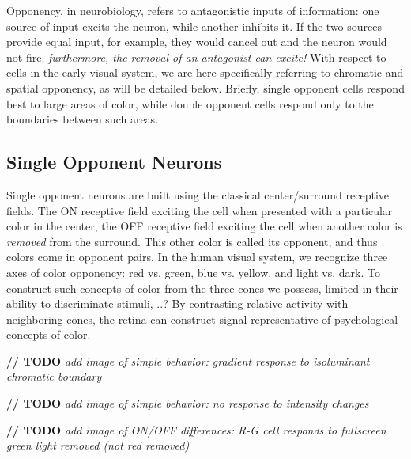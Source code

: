 \documentclass[journal,onecolumn]{IEEEtran}
\begin{document}
Opponency, in neurobiology, refers to antagonistic inputs of information: one source of input excits the neuron, while another inhibits it. If the two sources provide equal input, for example, they would cancel out and the neuron would not fire. 
\textit{furthermore, the removal of an antagonist can excite!}
With respect to cells in the early visual system, we are here specifically referring to chromatic and spatial opponency, as will be detailed below. Briefly, single opponent cells respond best to large areas of color, while double opponent cells respond only to the boundaries between such areas.


\subsection*{Single Opponent Neurons}

Single opponent neurons are built using the classical center/surround receptive fields. The ON receptive field exciting the cell when presented with a particular color in the center, the OFF receptive field exciting the cell when another color is \textit{removed} from the surround. This other color is called its opponent, and thus colors come in opponent pairs. In the human visual system, we recognize three axes of color opponency: red vs. green, blue vs. yellow, and light vs. dark. To construct such concepts of color from the three cones we possess, limited in their ability to discriminate stimuli, ..? By contrasting relative activity with neighboring cones,  the retina can construct signal representative of psychological concepts of color.


\textbf{// TODO} \textit{add image of simple behavior: gradient response to isoluminant chromatic boundary}

\textbf{// TODO} \textit{add image of simple behavior: no response to intensity changes}

\textbf{// TODO} \textit{add image of ON/OFF differences: R-G cell responds to fullscreen green light removed (not red removed)}
\end{document}
